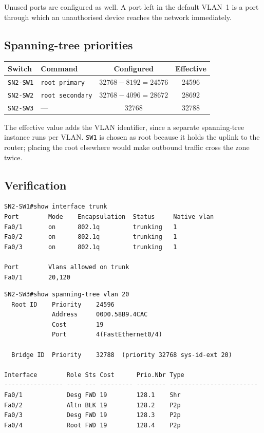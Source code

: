 \documentclass[12pt,a4paper]{article}
\begin{document}
Unused ports are configured as well. A port left in the default VLAN~1 is a port
through which an unauthorised device reaches the network immediately.

\subsection{Spanning-tree priorities}

\begin{table}[H]
\centering
\begin{tabular}{@{} l l c c @{}}
\toprule
\textbf{Switch} & \textbf{Command} & \textbf{Configured} & \textbf{Effective} \\
\midrule
\texttt{SN2-SW1} & \texttt{root primary}   & $32768-8192 = 24576$ & 24596 \\
\texttt{SN2-SW2} & \texttt{root secondary} & $32768-4096 = 28672$ & 28692 \\
\texttt{SN2-SW3} & ---                     & 32768                & 32788 \\
\bottomrule
\end{tabular}
\end{table}

The effective value adds the VLAN identifier, since a separate spanning-tree
instance runs per VLAN. \texttt{SW1} is chosen as root because it holds the
uplink to the router; placing the root elsewhere would make outbound traffic
cross the zone twice.

\subsection{Verification}

\begin{lstlisting}
SN2-SW1#show interface trunk
Port        Mode    Encapsulation  Status     Native vlan
Fa0/1       on      802.1q         trunking   1
Fa0/2       on      802.1q         trunking   1
Fa0/3       on      802.1q         trunking   1

Port        Vlans allowed on trunk
Fa0/1       20,120
\end{lstlisting}

\begin{lstlisting}
SN2-SW3#show spanning-tree vlan 20
  Root ID    Priority    24596
             Address     00D0.58B9.4CAC
             Cost        19
             Port        4(FastEthernet0/4)

  Bridge ID  Priority    32788  (priority 32768 sys-id-ext 20)

Interface        Role Sts Cost      Prio.Nbr Type
---------------- ---- --- --------- -------- ------------------------
Fa0/1            Desg FWD 19        128.1    Shr
Fa0/2            Altn BLK 19        128.2    P2p
Fa0/3            Desg FWD 19        128.3    P2p
Fa0/4            Root FWD 19        128.4    P2p
\end{lstlisting}
\end{document}
